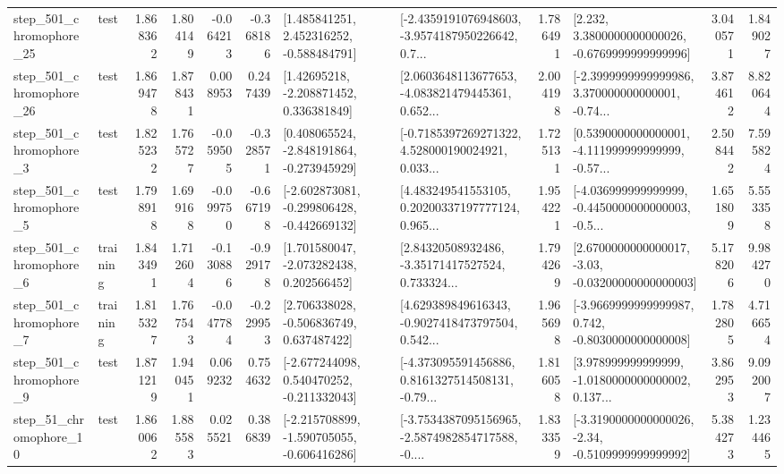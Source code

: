 \begin{tabular}{llrrrrllrlrr}
  step\_501\_chromophore\_25 &      test &      1.868362 &    1.804149 &     -0.064213 & -0.368186 &    [1.485841251, 2.452316252, -0.588484791] &  [-2.4359191076948603, -3.9574187950226642, 0.7... &       1.786491 &   [2.232, 3.3800000000000026, -0.6769999999999996] &            3.040571 &          1.849027 \\
  step\_501\_chromophore\_26 &      test &      1.869478 &    1.878431 &      0.008953 &  0.247439 &     [1.42695218, -2.208871452, 0.336381849] &  [2.0603648113677653, -4.083821479445361, 0.652... &       2.004198 &  [-2.3999999999999986, 3.370000000000001, -0.74... &            3.874612 &          8.820644 \\
   step\_501\_chromophore\_3 &      test &      1.825232 &    1.765727 &     -0.059505 & -0.328571 &   [0.408065524, -2.848191864, -0.273945929] &  [-0.7185397269271322, 4.528000190024921, 0.033... &       1.725131 &  [0.5390000000000001, -4.111999999999999, -0.57... &            2.508442 &          7.595824 \\
   step\_501\_chromophore\_5 &      test &      1.798918 &    1.699168 &     -0.099750 & -0.667198 &  [-2.602873081, -0.299806428, -0.442669132] &  [4.483249541553105, 0.20200337197777124, 0.965... &       1.954221 &  [-4.036999999999999, -0.4450000000000003, -0.5... &            1.651809 &          5.553358 \\
   step\_501\_chromophore\_6 &  training &      1.843491 &    1.712604 &     -0.130886 & -0.929178 &    [1.701580047, -2.073282438, 0.202566452] &  [2.84320508932486, -3.35171417527524, 0.733324... &       1.794269 &  [2.6700000000000017, -3.03, -0.03200000000000003] &            5.178206 &          9.984270 \\
   step\_501\_chromophore\_7 &  training &      1.815327 &    1.767543 &     -0.047784 & -0.229953 &    [2.706338028, -0.506836749, 0.637487422] &  [4.629389849616343, -0.9027418473797504, 0.542... &       1.965698 &  [-3.9669999999999987, 0.742, -0.8030000000000008] &            1.782805 &          4.716654 \\
   step\_501\_chromophore\_9 &      test &      1.871219 &    1.940451 &      0.069232 &  0.754632 &   [-2.677244098, 0.540470252, -0.211332043] &  [-4.373095591456886, 0.8161327514508131, -0.79... &       1.816058 &  [3.978999999999999, -1.0180000000000002, 0.137... &            3.862953 &          9.092007 \\
   step\_51\_chromophore\_10 &      test &      1.860062 &    1.885583 &      0.025521 &  0.386839 &  [-2.215708899, -1.590705055, -0.606416286] &  [-3.7534387095156965, -2.5874982854717588, -0.... &       1.833359 &  [-3.3190000000000026, -2.34, -0.5109999999999992] &            5.384273 &          1.234465 \\

\end{tabular}
